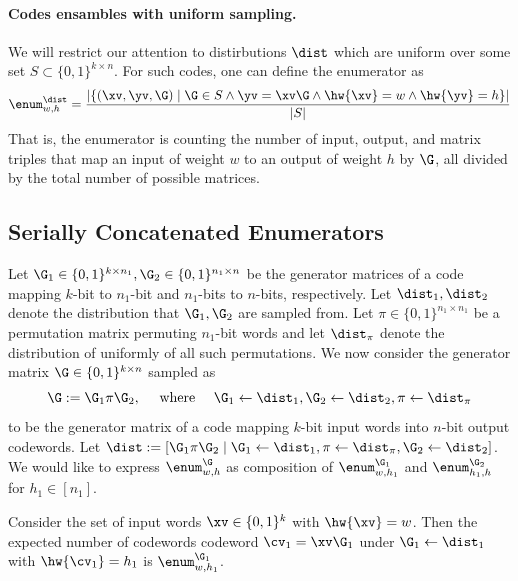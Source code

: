 \paragraph{Codes ensambles with uniform sampling.}
We will restrict our attention to distirbutions $\dist$ which are uniform over some set $S\subset \{0,1\}^{k\times n}$. For such codes, one can define the enumerator as
$$
\enum^\dist_{w,h} =\frac{\left|\{ (\xv,\yv,\G) \mid \G\in S\wedge \yv=\xv\G \wedge \hw{\xv}=w\wedge\hw{\yv}=h  \}\right|}{|S|}
$$
That is, the enumerator is counting the number of input, output, and matrix triples that map an input of weight $w$ to an output of weight $h$ by $\G$, all divided by the total number of possible matrices.

\subsection{Serially Concatenated Enumerators}\label{ssec:ceenum}

Let $\G_1 \in \{0,1\}^{k \times n_1},\G_2\in \{0,1\}^{n_1 \times n}$ be the generator matrices of a code mapping $k$-bit to  $n_1$-bit and $n_1$-bits to $n$-bits, respectively. Let $\dist_1,\dist_2$ denote the distribution that  $\G_1,\G_2$ are sampled from.
Let $\pi \in \{0,1\}^{n_1 \times n_1}$ be a permutation matrix permuting $n_1$-bit words and let $\dist_{\pi}$ denote the distribution of uniformly of all such permutations.
We now consider the generator matrix $\G \in \{0,1\}^{k \times n}$ sampled as
$$
\G:=\G_1\pi \G_2, \quad \text{ where }\quad \G_1\gets\dist_1,\G_2\gets\dist_2,\pi\gets\dist_\pi
$$
to be the generator matrix of a code mapping $k$-bit input words into $n$-bit output codewords. Let $\dist := [ \G_1\pi\G_2 \mid \G_1\gets \dist_1 ,\pi\gets \dist_{\pi},\G_2\gets \dist_2]$. We would like to express $\enum^{\G}_{w,h}$ as composition of $\enum^{\G_1}_{w,h_1}$ and $\enum^{\G_2}_{h_1,h}$ for $h_1\in [n_1]$.

Consider the set of input words $\xv \in \{0,1\}^k$ with $\hw{\xv} = w$. Then the expected number of codewords codeword $\cv_1 = \xv\G_1$ under $\G_1\gets \dist_1$ with $\hw{\cv_1} = h_1$ is $\enum^{\G_1}_{w,h_1}$.

